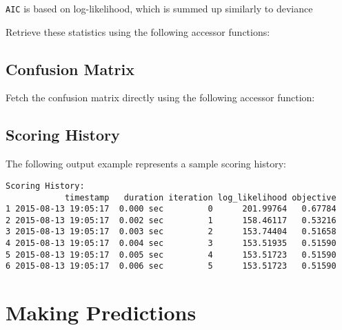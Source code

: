 \texttt{AIC} is based on log-likelihood, which is summed up similarly to deviance

Retrieve these statistics using the following accessor functions:

\waterExampleInR


\waterExampleInPython


\subsection{Confusion Matrix}

Fetch the confusion matrix directly using the following accessor function:

\waterExampleInR



\waterExampleInPython


\subsection{Scoring History}

The following output example represents a sample scoring history: 


\waterExampleInPython

\begin{lstlisting}[style=output]
Scoring History:
            timestamp   duration iteration log_likelihood objective
1 2015-08-13 19:05:17  0.000 sec         0      201.99764   0.67784
2 2015-08-13 19:05:17  0.002 sec         1      158.46117   0.53216
3 2015-08-13 19:05:17  0.003 sec         2      153.74404   0.51658
4 2015-08-13 19:05:17  0.004 sec         3      153.51935   0.51590
5 2015-08-13 19:05:17  0.005 sec         4      153.51723   0.51590
6 2015-08-13 19:05:17  0.006 sec         5      153.51723   0.51590
\end{lstlisting}




\section{Making Predictions}

